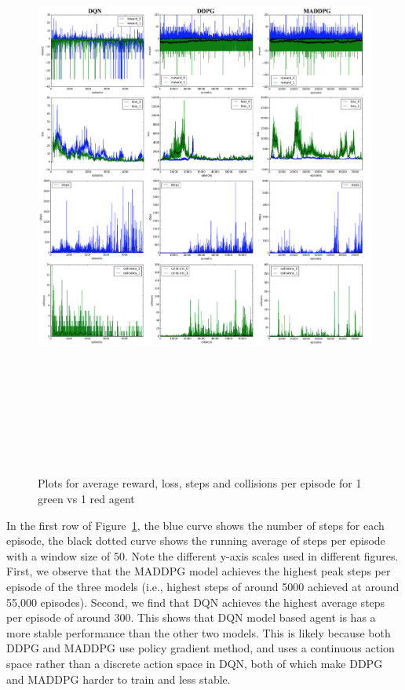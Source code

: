 \begin{figure}[htbp]
    \vspace*{-4cm}
    \hspace*{-3.5cm} 
    \includegraphics[width=21cm, height=20cm]{1vs1}
	\caption{Plots for average reward, loss, steps and collisions per episode for 1 green vs 1 red agent}\label{Figure 2}
  \label{fig:1vs1}
\end{figure}

In the first row of Figure~\ref{fig:1vs1}, the blue curve shows the number of
steps for each episode, the black dotted curve shows the running average of
steps per episode with a window size of 50. Note the different y-axis scales
used in different figures. First, we observe that the MADDPG model achieves the
highest peak steps per episode of the three models (i.e., highest steps of
around 5000 achieved at around 55,000 episodes). Second, we find that DQN
achieves the highest average steps per episode of around 300. This shows that
DQN model based agent is has a more stable performance than the other two
models. This is likely because both DDPG and MADDPG use policy gradient method,
and uses a continuous action space rather than a discrete action space in DQN,
both of which make DDPG and MADDPG harder to train and less stable.

